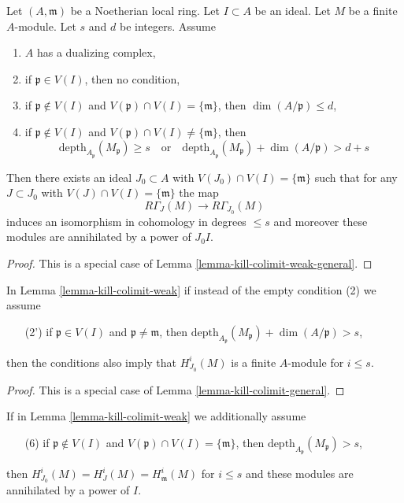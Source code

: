 \begin{lemma}
\label{lemma-kill-colimit-weak}
Let $(A, \mathfrak m)$ be a Noetherian local ring.
Let $I \subset A$ be an ideal. Let $M$ be a finite $A$-module.
Let $s$ and $d$ be integers. Assume
\begin{enumerate}
\item $A$ has a dualizing complex,
\item if $\mathfrak p \in V(I)$, then no condition,
\item if $\mathfrak p \not \in V(I)$ and
$V(\mathfrak p) \cap V(I) = \{\mathfrak m\}$, then
$\dim(A/\mathfrak p) \leq d$,
\item if $\mathfrak p \not \in V(I)$ and
$V(\mathfrak p) \cap V(I) \not = \{\mathfrak m\}$, then
$$
\text{depth}_{A_\mathfrak p}(M_\mathfrak p) \geq s
\quad\text{or}\quad
\text{depth}_{A_\mathfrak p}(M_\mathfrak p) + \dim(A/\mathfrak p) > d + s
$$
\end{enumerate}
Then there exists an ideal $J_0 \subset A$ with
$V(J_0) \cap V(I) = \{\mathfrak m\}$ such that for any $J \subset J_0$ with
$V(J) \cap V(I) = \{\mathfrak m\}$ the map
$$
R\Gamma_J(M) \longrightarrow R\Gamma_{J_0}(M)
$$
induces an isomorphism in cohomology in degrees $\leq s$
and moreover these modules are annihilated by a power of $J_0I$.
\end{lemma}

\begin{proof}
This is a special case of Lemma \ref{lemma-kill-colimit-weak-general}.
\end{proof}

\begin{lemma}
\label{lemma-kill-colimit}
In Lemma \ref{lemma-kill-colimit-weak} if instead of the empty
condition (2) we assume
\begin{enumerate}
\item[(2')] if $\mathfrak p \in V(I)$ and $\mathfrak p \not = \mathfrak m$,
then $\text{depth}_{A_\mathfrak p}(M_\mathfrak p) + \dim(A/\mathfrak p) > s$,
\end{enumerate}
then the conditions also imply that $H^i_{J_0}(M)$ is a finite
$A$-module for $i \leq s$.
\end{lemma}

\begin{proof}
This is a special case of Lemma \ref{lemma-kill-colimit-general}.
\end{proof}

\begin{lemma}
\label{lemma-kill-colimit-support}
If in Lemma \ref{lemma-kill-colimit-weak} we additionally assume
\begin{enumerate}
\item[(6)] if $\mathfrak p \not \in V(I)$ and
$V(\mathfrak p) \cap V(I) = \{\mathfrak m\}$, then
$\text{depth}_{A_\mathfrak p}(M_\mathfrak p) > s$,
\end{enumerate}
then $H^i_{J_0}(M) = H^i_J(M) = H^i_\mathfrak m(M)$ for $i \leq s$
and these modules are annihilated by a power of $I$.
\end{lemma}

